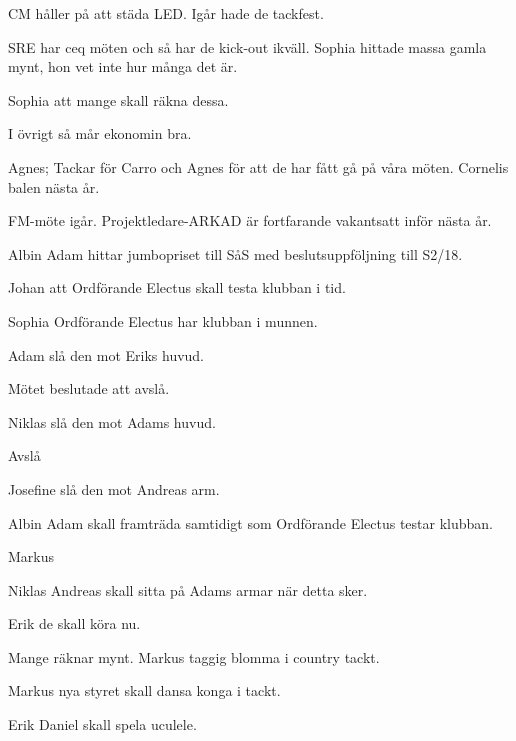 \documentclass[10pt]{article}
\begin{document}
\begin{paragrafer}
\begin{paragrafer}
CM håller på att städa LED. Igår hade de tackfest.

SRE har ceq möten och så har de kick-out ikväll.
Sophia hittade massa gamla mynt, hon vet inte hur många det är.

Sophia \ypa att mange skall räkna dessa.

\Mbaby

I övrigt så mår ekonomin bra.

\end{paragrafer}

Agnes; Tackar för Carro och Agnes för att de har fått gå på våra möten. Cornelis balen nästa år.

FM-möte igår. Projektledare-ARKAD är fortfarande vakantsatt inför nästa år.

Albin \ypa Adam hittar jumbopriset till SåS med beslutsuppföljning till S2/18.

Johan \ypa att Ordförande Electus skall testa klubban i tid.

\Mbaby

Sophia \ypa Ordförande Electus har klubban i munnen.

\Mbaby

Adam \ypa slå den mot Eriks huvud.

Mötet beslutade att avslå.

Niklas \ypa slå den mot Adams huvud.

Avslå

Josefine \ypa slå den mot Andreas arm.

\Mbaby

Albin \ypa Adam skall framträda samtidigt som Ordförande Electus testar klubban.

\Mbaby

Markus \ypa

Niklas \ypa Andreas skall sitta på Adams armar när detta sker.

\Mbaby

Erik \ypa de skall köra nu.

\Mbaby
Mange räknar mynt.
Markus \ypa taggig blomma i country tackt.

\Mbaby

Markus \ypa nya styret skall dansa konga i tackt.

\Mbaby

Erik \ypa Daniel skall spela uculele.


\end{paragrafer}
\end{document}

